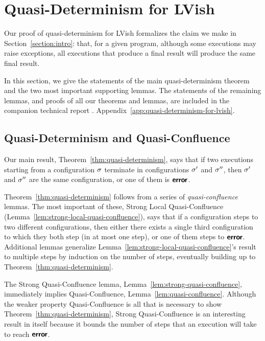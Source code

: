 \section{Quasi-Determinism for LVish}\label{section:proof}

Our proof of quasi-determinism for LVish formalizes the claim we make
in Section~\ref{section:intro}: that, for a given program, although
some executions may raise exceptions, all executions that produce a
final result will produce the same final result.

In this section, we give the statements of the main
quasi-determinism theorem and the two most important supporting
lemmas.  The statements of the remaining lemmas,
and proofs of all our theorems and lemmas,
are included in
\ifx\fulltr\undefined
the companion
technical report \cite{Freeze-TR}.
\else
Appendix~\ref{app:quasi-determinism-for-lvish}.
\fi

\subsection{Quasi-Determinism and Quasi-Confluence}

Our main result, Theorem~\ref{thm:quasi-determinism}, says that if two
executions starting from a configuration $\sigma$ terminate in
configurations $\sigma'$ and $\sigma''$, then $\sigma'$ and $\sigma''$ are
the same configuration, or one of them is $\textbf{\textsf{error}}$.

\ThmQuasiDeterminism

\noindent Theorem~\ref{thm:quasi-determinism} follows from a series of
\emph{quasi-confluence} lemmas.  The most important of these,
Strong Local Quasi-Confluence (Lemma~\ref{lem:strong-local-quasi-confluence}), says that if a
configuration steps to two different configurations, then either there
exists a single third configuration to which they both step (in at
most one step), or one of them steps to $\textbf{\textsf{error}}$.
Additional lemmas generalize Lemma~\ref{lem:strong-local-quasi-confluence}'s result to multiple
steps by induction on the number of steps, eventually building up to Theorem~\ref{thm:quasi-determinism}.

\LemStrongLocalQuasiConfluence

\noindent The Strong Quasi-Confluence lemma,
Lemma~\ref{lem:strong-quasi-confluence}, immediately implies
Quasi-Confluence, Lemma~\ref{lem:quasi-confluence}.  Although the
weaker property Quasi-Confluence is all that is necessary to show
Theorem~\ref{thm:quasi-determinism}, Strong Quasi-Confluence is an
interesting result in itself because it bounds the number of steps
that an execution will take to reach $\textbf{\textsf{error}}$.
\fi

